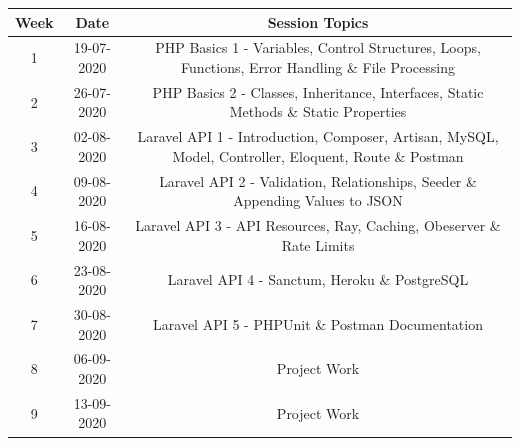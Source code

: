 \documentclass{article}
\begin{document}
\renewcommand{\arraystretch}{1.5}
\begin{tabular}{|c|c|c|c|}
	\hline
	\textbf{Week} & \textbf{Date}     & \multicolumn{2}{c|}{\textbf{Session Topics}}        \\ \hline
	\footnotesize 1      & \footnotesize 19-07-2020 & \multicolumn{2}{c|}{\footnotesize PHP Basics 1 - Variables, Control Structures, Loops, Functions, Error Handling \& File Processing} \\ \hline
	\footnotesize 2      & \footnotesize 26-07-2020 & \multicolumn{2}{c|}{\footnotesize PHP Basics 2 - Classes, Inheritance, Interfaces, Static Methods \& Static Properties} \\ \hline
	\footnotesize 3      & \footnotesize 02-08-2020 & \multicolumn{2}{c|}{\footnotesize Laravel API 1 - Introduction, Composer, Artisan, MySQL, Model, Controller, Eloquent, Route \& Postman} \\ \hline
	\footnotesize 4      & \footnotesize 09-08-2020 & \multicolumn{2}{c|}{\footnotesize Laravel API 2 - Validation, Relationships, Seeder \& Appending Values to JSON} \\ \hline
	\footnotesize 5      & \footnotesize 16-08-2020 & \multicolumn{2}{c|}{\footnotesize Laravel API 3 - API Resources, Ray, Caching, Obeserver \& Rate Limits} \\ \hline
	\footnotesize 6      & \footnotesize 23-08-2020 & \multicolumn{2}{c|}{\footnotesize Laravel API 4 - Sanctum, Heroku \& PostgreSQL} \\ \hline
	\footnotesize 7      & \footnotesize 30-08-2020 & \multicolumn{2}{c|}{\footnotesize Laravel API 5 - PHPUnit \& Postman Documentation} \\ \hline
	\footnotesize 8      & \footnotesize 06-09-2020 & \multicolumn{2}{c|}{\footnotesize Project Work} \\ \hline
	\footnotesize 9      & \footnotesize 13-09-2020 & \multicolumn{2}{c|}{\footnotesize Project Work} \\ \hline


\end{tabular}
\end{document}
